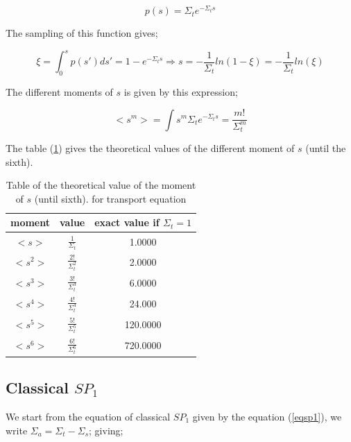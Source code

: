 \documentclass[a4paper, 12pt]{report}
\newcommand{\bl}{\big<}
\newcommand{\bg}{\big>}
\begin{document}
\begin{equation}
p(s) = \Sigma_t e ^{-\Sigma_t s}
\end{equation}

The sampling of this function gives;

\begin{equation}
\xi = \int_0^s p(s') ds' = 1 - e^{-\Sigma_t s} \Longrightarrow s = -\frac{1}{\Sigma_t}ln(1-\xi) = -\frac{1}{\Sigma_t}ln(\xi)
\end{equation}

The different moments of $s$ is given by this expression;

\begin{equation}
\bl s^m \bg = \int s^m \Sigma_t e ^{-\Sigma_t s} = \frac{m!}{\Sigma_t^m}
\end{equation}

The table (\ref{momenttransport}) gives the theoretical values of the different moment of $s$ (until the sixth).
\begin{center}
\begin{table}
\begin{center}
\begin{tabular}{|c|c|c|}
\hline
moment & value & exact value if $\Sigma_t = 1$ \\ \hline
$\bl s \bg$ &$ \frac{1}{\Sigma_t}$ & 1.0000  \\ \hline
$\bl s^2 \bg$ & $\frac{2!}{\Sigma_t^2}$ & 2.0000 \\ \hline
$\bl s^3 \bg$ &$ \frac{3!}{\Sigma_t^3}$ & 6.0000\\ \hline
$\bl s^4 \bg$ &$ \frac{4!}{\Sigma_t^4}$ & 24.000\\ \hline
$\bl s^5 \bg$ &$ \frac{5!}{\Sigma_t^5}$ & 120.0000 \\ \hline
$\bl s^6 \bg$ &$ \frac{6!}{\Sigma_t^6}$ & 720.0000 \\ \hline
\end{tabular}
\caption{\label{momenttransport} Table of the theoretical value of the moment of $s$ (until sixth). for transport equation}
\end{center}
\end{table}
\end{center}


\subsection{Classical $SP_1$}

We start from the equation of classical $SP_1$ given by the equation (\ref{eqsp1}), we write $\Sigma_a = \Sigma_t - \Sigma_s$; giving;
\end{document}
